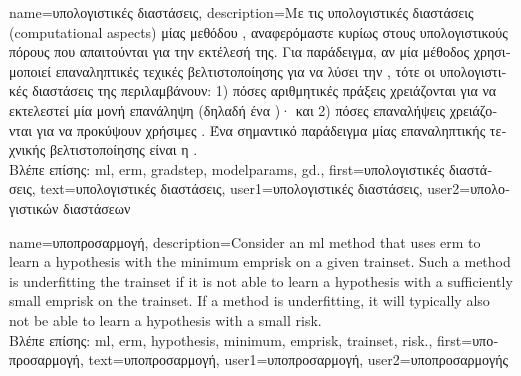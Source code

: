 {name={\foreignlanguage{greek}{υπολογιστικές διαστάσεις}}, 
	description={\foreignlanguage{greek}{Με τις υπολογιστικές διαστάσεις} (computational aspects) 
		\foreignlanguage{greek}{μίας μεθόδου} , \foreignlanguage{greek}{αναφερόμαστε κυρίως στους υπολογιστικούς πόρους  
		που απαιτούνται για την εκτέλεσή της. Για παράδειγμα, αν μία μέθοδος}  \foreignlanguage{greek}{χρησιμοποιεί  
		επαναληπτικές τεχικές βελτιστοποί\-ησης για να λύσει την} , \foreignlanguage{greek}{τότε οι υπολογιστικές διαστάσεις 
		της περιλαμβάνουν: 1) πόσες αριθμητικές πράξεις χρειάζονται για να εκτελεστεί μία μονή επανάληψη (δηλαδή ένα} )·  
		\foreignlanguage{greek}{και 2) πόσες επαναλήψεις χρειάζονται για να προκύψουν χρήσιμες} . 
		\foreignlanguage{greek}{Ένα σημαντικό παράδειγμα μίας επαναληπτικής τεχνικής βελτιστοποίησης είναι η} .\\
		\foreignlanguage{greek}{Βλέπε επίσης:} \gls{ml}, \gls{erm}, \gls{gradstep}, \gls{modelparams}, \gls{gd}.}, 
		first={\foreignlanguage{greek}{υπολογιστικές διαστάσεις}},
		text={\foreignlanguage{greek}{υπολογιστικές διαστάσεις}},
		user1={\foreignlanguage{greek}{υπολογιστικές διαστάσεις}}, %
		user2={\foreignlanguage{greek}{υπολογιστικών διαστάσεων}} %
}

{name={\foreignlanguage{greek}{υποπροσαρμογή}},
	description={Consider 
		an \gls{ml} method that uses \gls{erm} to learn a \gls{hypothesis} with the \gls{minimum} \gls{emprisk} 
		on a given \gls{trainset}. Such a method is underfitting the \gls{trainset} if it is 
		not able to learn a \gls{hypothesis} with a sufficiently small \gls{emprisk} on the \gls{trainset}. 
		If a method is underfitting, it will typically also not be able to learn a \gls{hypothesis} with 
		a small \gls{risk}.\\
		\foreignlanguage{greek}{Βλέπε επίσης:} \gls{ml}, \gls{erm}, \gls{hypothesis}, \gls{minimum}, \gls{emprisk}, \gls{trainset}, \gls{risk}.},
		first={\foreignlanguage{greek}{υποπροσαρμογή}},
		text={\foreignlanguage{greek}{υποπροσαρμογή}},
		user1={\foreignlanguage{greek}{υποπροσαρμογή}}, %
    		user2={\foreignlanguage{greek}{υποπροσαρμογής}} %
}

